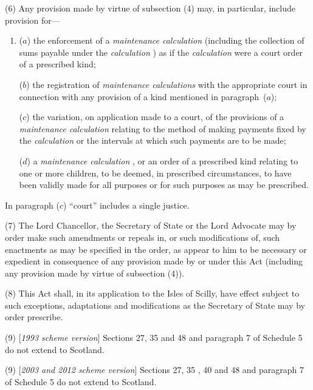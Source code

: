 \documentclass[12pt,a4paper]{article}
\begin{document}
(6) Any provision made by virtue of subsection (4)  may, in particular, include provision for—
\begin{enumerate}\item[]
($a$) the enforcement of a 
\emph{maintenance calculation}  %
(including the collection of sums payable under the 
\emph{calculation}%
) as if the 
\emph{calculation}  %
were a court order of a prescribed kind;

($b$) the registration of 
\emph{maintenance calculations}  %
with the appropriate court in connection with any provision of a kind mentioned in paragraph~($a$);

($c$) the variation, on application made to a court, of the provisions of a 
\emph{maintenance calculation}  %
relating to the method of making payments fixed by the 
\emph{calculation}  %
or the intervals at which such payments are to be made;

($d$) a 
\emph{maintenance calculation}%
, or an order of a prescribed kind relating to one or more children, to be deemed, in prescribed circumstances, to have been validly made for all purposes or for such purposes as may be prescribed.
\end{enumerate}

In paragraph ($c$)  “court” includes a single justice.

(7) The Lord Chancellor, the Secretary of State or the Lord Advocate may by order make such amendments or repeals in, or such modifications of, such enactments as may be specified in the order, as appear to him to be necessary or expedient in consequence of any provision made by or under this Act (including any provision made by virtue of subsection (4)).

(8) This Act shall, in its application to the Isles of Scilly, have effect subject to such exceptions, adaptations and modifications as the Secretary of State may by order prescribe.

(9) [\emph{1993 scheme version}] Sections 27, 35 and 48 and paragraph 7 of Schedule 5 do not extend to Scotland.

(9) [\emph{2003 and 2012 scheme version}] Sections 27, 35%
, 40  %
 and 48 and paragraph 7 of Schedule 5 do not extend to Scotland.
\end{document}
